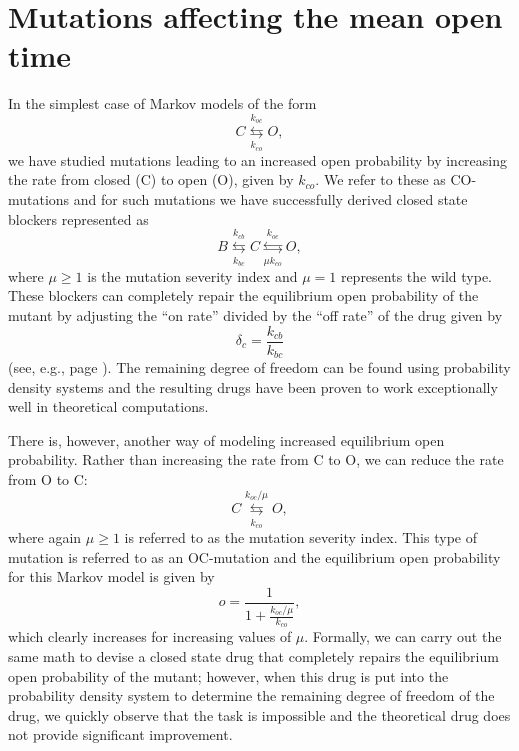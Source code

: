 
\chapter{Mutations affecting the mean open time \label{mot_chapter}}

In the simplest case of Markov models of the form
\begin{equation}
C\underset{k_{co}}{\overset{k_{oc}}{\leftrightarrows}}O, \label{mot_markov}%
\end{equation}
we have studied mutations leading to an increased open probability by increasing
the rate from closed (C) to open (O), given by $k_{co}$. We refer to these as 
CO-mutations and for such mutations we
have successfully derived closed state blockers represented as%
\begin{equation}
B\underset{k_{bc}}{\overset{k_{cb}}{\leftrightarrows}}C\underset{\mu
k_{co}}{\overset{k_{oc}}{\leftrightarrows}}O, \label{mot_cl}%
\end{equation}
where $\mu\geqslant1$ is the mutation severity index and $\mu=1$
represents the wild type. These blockers can completely repair the equilibrium
open probability of the mutant by adjusting the ``on rate'' divided by the
``off rate'' of the drug given by
\[
\delta_{c}=\frac{k_{cb}}{k_{bc}}
\]
(see, e.g., page \pageref{d_c}). The remaining degree of freedom can be found
using probability density systems and the resulting drugs have been proven to
work exceptionally well in theoretical computations.

There is, however, another way of modeling increased equilibrium open
probability. Rather than increasing the rate from C to O, we can reduce the
rate from O to C:%
\begin{equation}
C\underset{k_{co}}{\overset{k_{oc}/\mu}{\leftrightarrows}}O,
\end{equation}
where again $\mu\geqslant1$ is referred to as the mutation severity index. 
This type of mutation is referred to as an OC-mutation and the
equilibrium open probability for this Markov model is given by%
\[
o=\frac{1}{1+\frac{k_{oc}/\mu}{k_{co}}},%
\]
which clearly increases for increasing values of $\mu.$ Formally, we can carry out
the same math to devise a closed state drug that completely repairs the
equilibrium open probability of the mutant; however, when this drug is put into the
probability density system to determine the remaining degree of
freedom of the drug, we quickly observe that the task is impossible and the
theoretical drug does not provide significant improvement.

